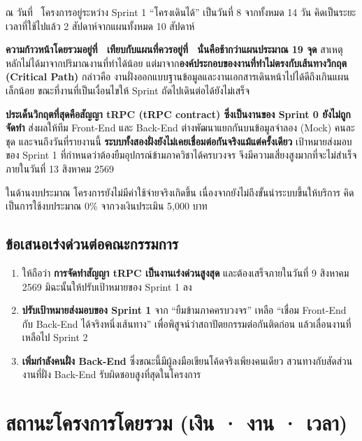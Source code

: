 ณ วันที่ \reportdate\ โครงการอยู่ระหว่าง Sprint 1 ``โครงเดินได้'' เป็นวันที่ 8 จากทั้งหมด 14 วัน คิดเป็นระยะเวลาที่ใช้ไปแล้ว 2 สัปดาห์จากแผนทั้งหมด 10 สัปดาห์

\textbf{ความก้าวหน้าโดยรวมอยู่ที่ \actualpct\ เทียบกับแผนที่ควรอยู่ที่ \plannedpct\ นั่นคือช้ากว่าแผนประมาณ 19 จุด} สาเหตุหลักไม่ได้มาจากปริมาณงานที่ทำได้น้อย แต่มาจาก\textbf{องค์ประกอบของงานที่ทำไม่ตรงกับเส้นทางวิกฤต (Critical Path)} กล่าวคือ งานฝั่งออกแบบฐานข้อมูลและงานเอกสารเดินหน้าไปได้ดีถึงเกินแผนเล็กน้อย ขณะที่งานที่เป็นเงื่อนไขให้ Sprint ถัดไปเดินต่อได้ยังไม่เสร็จ

\textbf{ประเด็นวิกฤตที่สุดคือสัญญา tRPC (tRPC contract) ซึ่งเป็นงานของ Sprint 0 ยังไม่ถูกจัดทำ} ส่งผลให้ทีม Front-End และ Back-End ต่างพัฒนาแยกกันบนข้อมูลจำลอง (Mock) คนละชุด และจนถึงวันที่รายงานนี้ \textbf{ระบบทั้งสองฝั่งยังไม่เคยเชื่อมต่อกันจริงแม้แต่ครั้งเดียว} เป้าหมายส่งมอบของ Sprint 1 ที่กำหนดว่าต้องยืมอุปกรณ์ข้ามภาควิชาได้ครบวงจร จึงมีความเสี่ยงสูงมากที่จะไม่สำเร็จภายในวันที่ 13 สิงหาคม 2569

ในด้านงบประมาณ โครงการยังไม่มีค่าใช้จ่ายจริงเกิดขึ้น เนื่องจากยังไม่ถึงขั้นนำระบบขึ้นให้บริการ คิดเป็นการใช้งบประมาณ 0\% จากวงเงินประเมิน 5{,}000 บาท

\subsection*{ข้อเสนอเร่งด่วนต่อคณะกรรมการ}

\begin{enumerate}
  \item ให้ถือว่า \textbf{การจัดทำสัญญา tRPC เป็นงานเร่งด่วนสูงสุด} และต้องเสร็จภายในวันที่ 9 สิงหาคม 2569 มิฉะนั้นให้ปรับเป้าหมายของ Sprint 1 ลง
  \item \textbf{ปรับเป้าหมายส่งมอบของ Sprint 1} จาก ``ยืมข้ามภาคครบวงจร'' เหลือ ``เชื่อม Front-End กับ Back-End ได้จริงหนึ่งเส้นทาง'' เพื่อพิสูจน์ว่าสถาปัตยกรรมต่อกันติดก่อน แล้วเลื่อนงานที่เหลือไป Sprint 2
  \item \textbf{เพิ่มกำลังคนฝั่ง Back-End} ซึ่งขณะนี้มีผู้ลงมือเขียนโค้ดจริงเพียงคนเดียว สวนทางกับสัดส่วนงานที่ฝั่ง Back-End รับผิดชอบสูงที่สุดในโครงการ
\end{enumerate}

\section{สถานะโครงการโดยรวม (เงิน · งาน · เวลา)}

